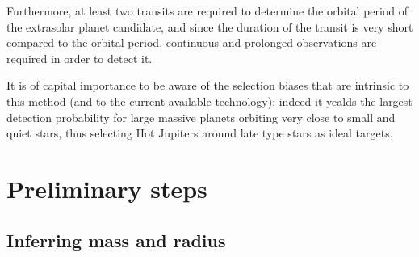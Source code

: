 \documentclass[a4paper,11pt,twocolumn]{article}
\begin{document}
Furthermore, at least two transits are required to determine the orbital period of the extrasolar planet candidate, and since the duration of the transit is very short compared to the orbital period, continuous and prolonged observations are required in order to detect it.

It is of capital importance to be aware of the selection biases that are intrinsic to this method (and to the current available technology): indeed it yealds the largest detection probability for large massive planets orbiting very close to small and quiet stars, thus selecting Hot Jupiters around late type stars as ideal targets.

\section{Preliminary steps}

\subsection{Inferring mass and radius}
\end{document}
